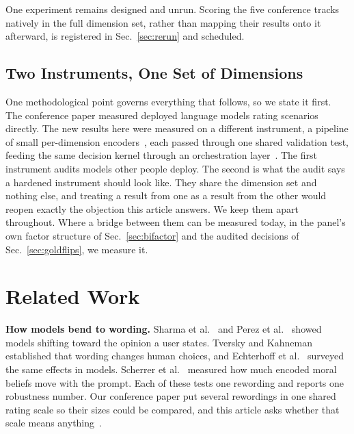 \documentclass[journal]{IEEEtran}
\begin{document}
One experiment remains designed and unrun. Scoring the five conference tracks
natively in the full dimension set, rather than mapping their results onto it
afterward, is registered in Sec.~\ref{sec:rerun} and scheduled.

\subsection{Two Instruments, One Set of Dimensions}
\label{sec:twoinstruments}

One methodological point governs everything that follows, so we state it
first. The conference paper measured deployed language models rating
scenarios directly. The new results here were measured on a different
instrument, a pipeline of small per-dimension encoders~\cite{xbse}, each
passed through one shared validation test, feeding the same decision kernel
through an orchestration layer~\cite{msa}. The first instrument audits
models other people deploy. The second is what the audit says a hardened
instrument should look like. They share the dimension set and nothing else,
and treating a result from one as a result from the other would reopen
exactly the objection this article answers. We keep them apart throughout.
Where a bridge between them can be measured today, in the panel's own factor
structure of Sec.~\ref{sec:bifactor} and the audited decisions of
Sec.~\ref{sec:goldflips}, we measure it.

\section{Related Work}
\label{sec:related}

\textbf{How models bend to wording.} Sharma et al.~\cite{sharma2024sycophancy}
and Perez et al.~\cite{perez2023model} showed models shifting toward the
opinion a user states. Tversky and Kahneman~\cite{tversky1981framing}
established that wording changes human choices, and
Echterhoff et al.~\cite{echterhoff2024cognitive} surveyed the same effects in
models. Scherrer et al.~\cite{scherrer2023moral} measured how much encoded
moral beliefs move with the prompt. Each of these tests one rewording and
reports one robustness number. Our conference paper put several rewordings in
one shared rating scale so their sizes could be compared, and this article
asks whether that scale means anything~\cite{bond2026bds}.
\end{document}
